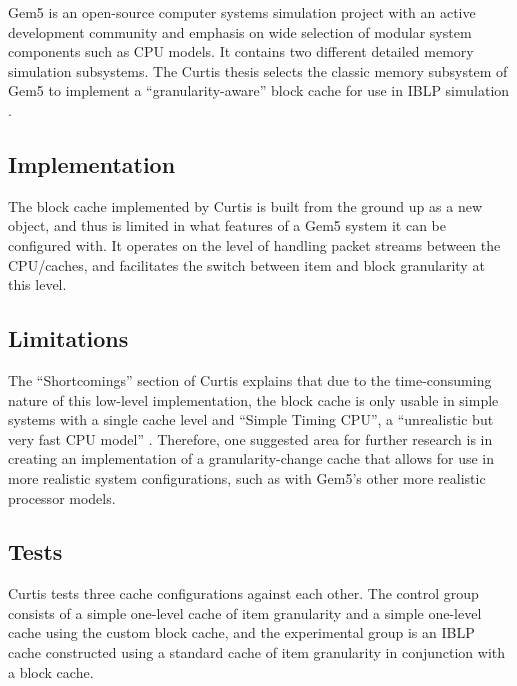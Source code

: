 \documentclass[12pt,twoside]{reedthesis}
\begin{document}
	Gem5 is an open-source computer systems simulation project with an active development community and emphasis on wide selection of modular system components such as CPU models. It contains two different detailed memory simulation subsystems. The Curtis thesis selects the classic memory subsystem of Gem5 to implement a ``granularity-aware'' block cache for use in IBLP simulation \cite{curtis}.

	\subsection*{Implementation}

	The block cache implemented by Curtis is built from the ground up as a new object, and thus is limited in what features of a Gem5 system it can be configured with. It operates on the level of handling packet streams between the CPU/caches, and facilitates the switch between item and block granularity at this level.

	\subsection*{Limitations}

	The ``Shortcomings'' section of Curtis explains that due to the time-consuming nature of this low-level implementation, the block cache is only usable in simple systems with a single cache level and ``Simple Timing CPU'', a ``unrealistic but very fast CPU model'' \cite{curtis}. Therefore, one suggested area for further research is in creating an implementation of a granularity-change cache that allows for use in more realistic system configurations, such as with Gem5's other more realistic processor models.

	\subsection*{Tests}

	Curtis tests three cache configurations against each other. The control group consists of a simple one-level cache of item granularity and a simple one-level cache using the custom block cache, and the experimental group is an IBLP cache constructed using a standard cache of item granularity in conjunction with a block cache.
	
\end{document}
